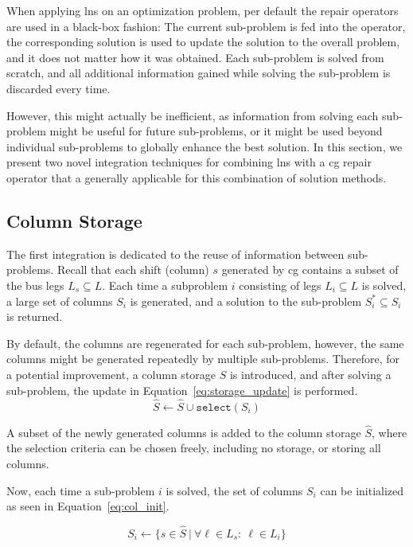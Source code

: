 \documentclass[]{amsart}
\theoremstyle{plain}
\begin{document}
When applying \acrfull{lns} on an optimization problem, per default the repair operators are used in a black-box fashion: The current sub-problem is fed into the operator, the corresponding solution is used to update the solution to the overall problem, and it does not matter how it was obtained. Each sub-problem is solved from scratch, and all additional information gained while solving the sub-problem is discarded every time.

However, this might actually be inefficient, as information from solving each sub-problem might be useful for future sub-problems, or it might be used beyond individual sub-problems to globally enhance the best solution. In this section, we present two novel integration techniques for combining \gls{lns} with a \acrfull{cg} repair operator that a generally applicable for this combination of solution methods.

\subsection{Column Storage}\label{sec:column_storage}

The first integration is dedicated to the reuse of information between sub-problems. Recall that each shift (column) $s$ generated by \gls{cg} contains a subset of the bus legs $L_s\subseteq L$. Each time a subproblem $i$ consisting of legs $L_i\subseteq L$ is solved, a large set of columns $S_i$ is generated, and a solution to the sub-problem $S_i^*\subseteq S_i$ is returned.

By default, the columns are regenerated for each sub-problem, however, the same columns might be generated repeatedly by multiple sub-problems. Therefore, for a potential improvement, a column storage $\hat{S}$ is introduced, and after solving a sub-problem, the update in Equation~\eqref{eq:storage_update} is performed.
\begin{equation}\label{eq:storage_update}
    \hat{S}\gets \hat{S}\cup\texttt{select}(S_i)
\end{equation}

\noindent
A subset of the newly generated columns is added to the column storage $\hat{S}$, where the selection criteria can be chosen freely, including no storage, or storing all columns.

Now, each time a sub-problem $i$ is solved, the set of columns $S_i$ can be initialized as seen in Equation~\eqref{eq:col_init}.

\begin{equation}\label{eq:col_init}
    S_i\gets\{s\in\hat{S}~|~\forall\ell\in L_s:\ \ell\in L_i\}
\end{equation}
\end{document}
